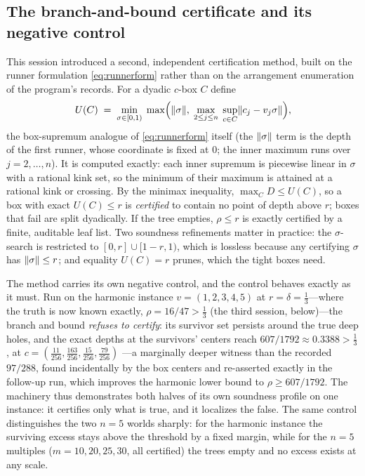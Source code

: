 \subsection{The branch-and-bound certificate and its negative control}
\label{sec:bb}

This session introduced a second, independent certification method,
built on the runner formulation \eqref{eq:runnerform} rather than on
the arrangement enumeration of the program's records. For a dyadic
$c$-box $C$ define
\[
U(C)\;=\;\min_{\sigma\in[0,1)}\;
\max\Bigl(\lVert \sigma \rVert,\;\max_{2\le j\le n}\;
\sup_{c\in C}\lVert c_j-v_j\sigma \rVert\Bigr),
\]
the box-supremum analogue of \eqref{eq:runnerform} itself (the
$\lVert \sigma \rVert$ term is the depth of the first runner, whose coordinate is
fixed at $0$; the inner maximum runs over $j=2,\dots,n$). It is
computed exactly: each inner supremum is piecewise linear in $\sigma$
with a rational kink set, so the minimum of their maximum is attained at
a rational kink or crossing. By the minimax inequality,
$\max_C D\le U(C)$, so a box with exact $U(C)\le r$ is \emph{certified}
to contain no point of depth above $r$; boxes that fail are split
dyadically. If the tree empties, $\rho\le r$ is exactly certified by a
finite, auditable leaf list. Two soundness refinements matter in
practice: the $\sigma$-search is restricted to
$[0,r]\cup[1-r,1)$, which is lossless because any certifying $\sigma$
has $\lVert \sigma \rVert\le r$; and equality $U(C)=r$ prunes, which the tight
boxes need.

The method carries its own negative control, and the control behaves
exactly as it must. Run on the harmonic instance $v=(1,2,3,4,5)$ at
$r=\delta=\tfrac13$---where the truth is now known exactly,
$\rho=16/47>\tfrac13$ (the third session, below)---the
branch and bound \emph{refuses to certify}: its survivor set persists
around the true deep holes, and the exact depths at the survivors'
centers reach $607/1792\approx0.3388>\tfrac13$, at
$c=(\tfrac{11}{256},\tfrac{163}{256},\tfrac{15}{256},\tfrac{79}{256})$
---a marginally deeper witness than the recorded $97/288$, found
incidentally by the box centers and re-asserted exactly in the follow-up
run, which improves the harmonic lower bound to $\rho\ge607/1792$. The machinery thus demonstrates both halves of its own
soundness profile on one instance: it certifies only what is true, and
it localizes the false. The same control distinguishes the two
$n=5$ worlds sharply: for the harmonic instance the surviving excess
stays above the threshold by a fixed margin, while for the $n=5$
multiples ($m=10,20,25,30$, all certified) the trees empty and no
excess exists at any scale.

